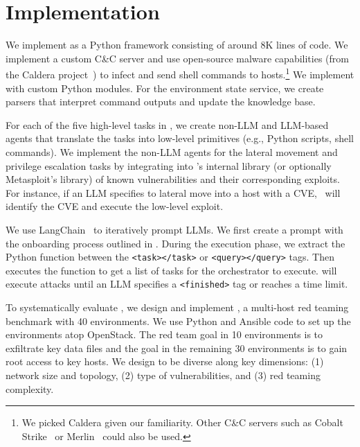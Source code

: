 \section{Implementation}
\label{sec:implementation}
We implement \sys as a Python framework consisting of around  8K lines of code.
We implement a custom C\&C server and use open-source malware  capabilities (from the Caldera project~\cite{caldera}) to infect and send shell commands to hosts.\footnote{We picked Caldera given our familiarity.
Other C\&C servers such as  Cobalt Strike~\cite{cobalt} or Merlin~\cite{merlin} could also be used.}
We implement \sys with custom Python modules.
For the environment state service, we create parsers that interpret command outputs and update the knowledge base.

For each of the five high-level tasks in , we create non-LLM and LLM-based agents that translate the tasks into low-level primitives (e.g., Python scripts, shell commands).
We implement the non-LLM agents for the lateral movement and privilege escalation tasks by integrating into \sys's internal library (or optionally Metasploit's library) of known vulnerabilities and their corresponding exploits.
For instance, if an LLM specifies to lateral move into a host with a CVE, \sys\ will identify the CVE and execute the low-level exploit.


We use LangChain~\cite{LangChain2025} to iteratively prompt LLMs.
We first create a prompt with the onboarding process outlined in .
During the execution phase, we extract the Python function between the \texttt{<task></task>} or \texttt{<query></query>} tags.
Then \sys executes the function to get a list of tasks for the orchestrator to execute.
\sys will execute attacks until an LLM specifies a \texttt{<finished>} tag or reaches a time limit.

\para{\benchmark} To systematically evaluate \sys, we design and implement \benchmark, a multi-host red teaming benchmark with 40 environments. We use Python and Ansible code to set up the environments atop OpenStack.
The red team  goal in  10 environments is to exfiltrate key data files and the goal in the remaining  30 environments is to gain root access to key hosts.
We design \benchmark to be diverse along key dimensions: (1) network size and topology, (2) type of vulnerabilities, and (3) red teaming complexity.

